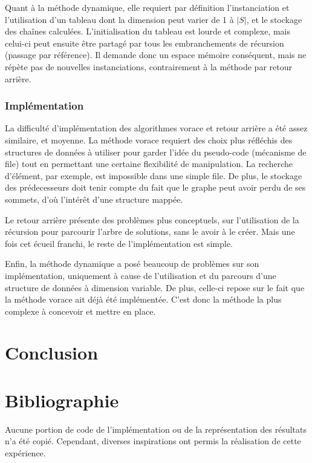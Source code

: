 \documentclass[10pt,a4paper]{article}
\begin{document}
Quant à la méthode dynamique, elle requiert par définition l'instanciation et l'utilisation d'un tableau dont la dimension peut varier de 1 à $|S|$, et le stockage des chaînes calculées. L'initialisation du tableau est lourde et complexe, mais celui-ci peut ensuite être partagé par tous les embranchements de récursion (passage par référence). Il demande donc un espace mémoire conséquent, mais ne répète pas de nouvelles instanciations, contrairement à la méthode par retour arrière.

\subsubsection{Implémentation}

La difficulté d'implémentation des algorithmes vorace et retour arrière a été assez similaire, et moyenne. La méthode vorace requiert des choix plus réfléchis des structures de données à utiliser pour garder l'idée du pseudo-code (mécanisme de file) tout en permettant une certaine flexibilité de manipulation. La recherche d'élément, par exemple, est impossible dans une simple file. De plus, le stockage des prédecesseurs doit tenir compte du fait que le graphe peut avoir perdu de ses sommets, d'où l'intérêt d'une structure mappée.

Le retour arrière présente des problèmes plus conceptuels, sur l'utilisation de la récursion pour parcourir l'arbre de solutions, sans le avoir à le créer. Mais une fois cet écueil franchi, le reste de l'implémentation est simple.

Enfin, la méthode dynamique a posé beaucoup de problèmes sur son implémentation, uniquement à cause de l'utilisation et du parcours d'une structure de données à dimension variable. De plus, celle-ci repose sur le fait que la méthode vorace ait déjà été implémentée. C'est donc la méthode la plus complexe à concevoir et mettre en place.

\section{Conclusion}

\section{Bibliographie}

Aucune portion de code de l'implémentation ou de la représentation des résultats n'a été copié. Cependant, diverses inspirations ont permis la réalisation de cette expérience.
\end{document}

